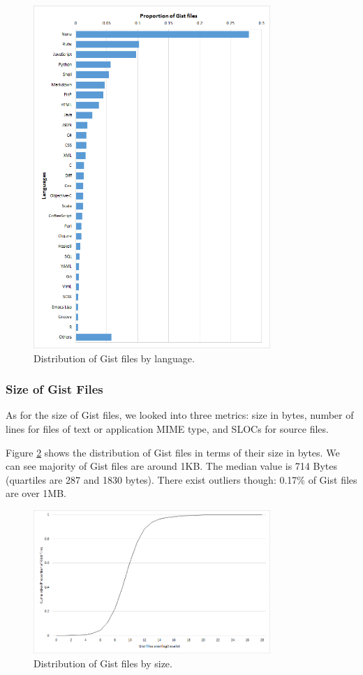 \begin{figure}[!htbp]
	\centering
	\includegraphics[width=0.8\textwidth]{figures/languageDistribution.png}
	\caption{Distribution of Gist files by language.}
	\label{fig:languageDist}
\end{figure}

\subsubsection{Size of Gist Files}
As for the size of Gist files, we looked into three metrics: size in bytes, number of lines for files of text or application MIME type, and SLOCs for source files. 

Figure \ref{fig:size} shows the distribution of Gist files in terms of their size in bytes. We can see majority of Gist files are around 1KB. The median value is 714 Bytes (quartiles are 287 and 1830 bytes). There exist outliers though: 0.17\% of Gist files are over 1MB.

\begin{figure}[!htb]
	\centering
	\includegraphics[width=0.8\textwidth]{figures/gist_file_size_log.png}
	\caption{Distribution of Gist files by size.}
	\label{fig:size}
\end{figure}

